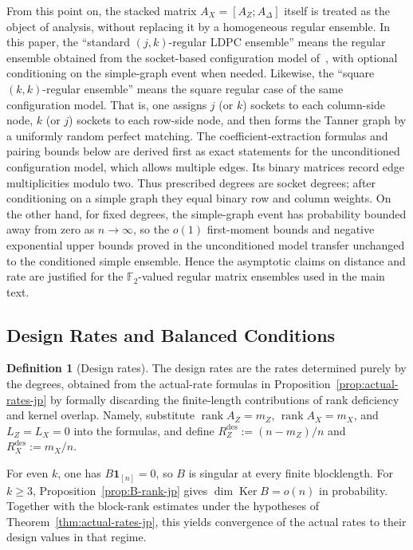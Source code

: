 \documentclass[11pt]{article}
\theoremstyle{definition}
\newtheorem{definition}[theorem]{Definition}
\newcommand{\F}{\mathbb F}
\newcommand{\rank}{\operatorname{rank}}
\newcommand{\Ker}{\operatorname{Ker}}
\newcommand{\ones}{\mathbf 1}
\begin{document}
From this point on, the stacked matrix \(A_X=[A_Z;A_\Delta]\) itself is treated as the object of analysis, without replacing it by a homogeneous regular ensemble.
In this paper, the ``standard \((j,k)\)-regular LDPC ensemble'' means the regular ensemble obtained from the socket-based configuration model of~\cite[Secs.~3.3--3.4]{RU08}, with optional conditioning on the simple-graph event when needed. Likewise, the ``square \((k,k)\)-regular ensemble'' means the square regular case of the same configuration model. That is, one assigns \(j\) (or \(k\)) sockets to each column-side node, \(k\) (or \(j\)) sockets to each row-side node, and then forms the Tanner graph by a uniformly random perfect matching. The coefficient-extraction formulas and pairing bounds below are derived first as exact statements for the unconditioned configuration model, which allows multiple edges. Its binary matrices record edge multiplicities modulo two. Thus prescribed degrees are socket degrees; after conditioning on a simple graph they equal binary row and column weights. On the other hand, for fixed degrees, the simple-graph event has probability bounded away from zero as \(n\to\infty\), so the \(o(1)\) first-moment bounds and negative exponential upper bounds proved in the unconditioned model transfer unchanged to the conditioned simple ensemble. Hence the asymptotic claims on distance and rate are justified for the \(\F_2\)-valued regular matrix ensembles used in the main text.

\subsection{Design Rates and Balanced Conditions}

\begin{definition}[Design rates]\label{def:rates-jp}
The design rates are the rates determined purely by the degrees, obtained from the actual-rate formulas in Proposition~\ref{prop:actual-rates-jp} by formally discarding the finite-length contributions of rank deficiency and kernel overlap. Namely, substitute \(\rank A_Z=m_Z\), \(\rank A_X=m_X\), and \(L_Z=L_X=0\) into the formulas, and define \(R_Z^{\mathrm{des}}:=(n-m_Z)/n\) and \(R_X^{\mathrm{des}}:=m_X/n\).
\end{definition}

For even \(k\), one has \(B\ones_{[n]}=0\), so \(B\) is singular
at every finite blocklength. For \(k\ge3\),
Proposition~\ref{prop:B-rank-jp} gives \(\dim\Ker B=o(n)\) in probability.
Together with the block-rank estimates under the hypotheses of
Theorem~\ref{thm:actual-rates-jp}, this yields convergence of the actual
rates to their design values in that regime.
\end{document}
